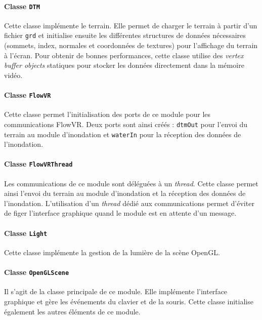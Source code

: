 \documentclass[a4paper, 12pt]{article}
\begin{document}
\paragraph{Classe \texttt{DTM}}

Cette classe implémente le terrain. Elle permet de charger le terrain à partir
d'un fichier \texttt{grd} et initialise ensuite les différentes structures de
données nécessaires (sommets, index, normales et coordonnées de textures) pour
l'affichage du terrain à l'écran. Pour obtenir de bonnes performances, cette
classe utilise des \textit{vertex buffer objects} statiques pour stocker les
données directement dans la mémoire vidéo.

\paragraph{Classe \texttt{FlowVR}}

Cette classe permet l'initialisation des ports de ce module pour les
communications FlowVR. Deux ports sont ainsi créés : \texttt{dtmOut} pour
l'envoi du terrain au module d'inondation et \texttt{waterIn} pour la réception
des données de l'inondation.

\paragraph{Classe \texttt{FlowVRThread}}

Les communications de ce module sont déléguées à un \textit{thread}. Cette
classe permet ainsi l'envoi du terrain au module d'inondation et la réception
des données de l'inondation. L'utilisation d'un \textit{thread} dédié aux
communications permet d'éviter de figer l'interface graphique quand le module
est en attente d'un message.

\paragraph{Classe \texttt{Light}}

Cette classe implémente la gestion de la lumière de la scène OpenGL.


\paragraph{Classe \texttt{OpenGLScene}}

Il s'agit de la classe principale de ce module. Elle implémente l'interface
graphique et gère les événements du clavier et de la souris. Cette classe
initialise également les autres éléments de ce module.
\end{document}
